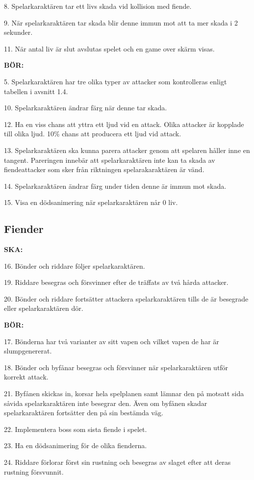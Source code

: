 \documentclass{TDP005mall}
\begin{document}
8. Spelarkaraktären tar ett livs skada vid kollision med fiende.

9. När spelarkaraktären tar skada blir denne immun mot att ta mer skada i 2 sekunder. 

11. När antal liv är slut avslutas spelet och en game over skärm visas.

\textbf{BÖR:}

5. Spelarkaraktären har tre olika typer av attacker som kontrolleras enligt tabellen i avsnitt 1.4.

10. Spelarkaraktären ändrar färg när denne tar skada.

12. Ha en viss chans att yttra ett ljud vid en attack. Olika attacker är kopplade till olika ljud. 10\% chans att producera ett ljud vid attack.

13. Spelarkaraktären ska kunna parera attacker genom att spelaren håller inne en tangent. Pareringen innebär att spelarkaraktären inte kan ta skada av fiendeattacker som sker från riktningen spelarakaraktären är vänd.

14. Spelarkaraktären ändrar färg under tiden denne är immun mot skada.

15. Visa en dödsanimering när spelarkaraktären når 0 liv.
\subsection{Fiender}
\textbf{SKA:}

16. Bönder och riddare följer spelarkaraktären.

19. Riddare besegras och försvinner efter de träffats av två hårda attacker.

20. Bönder och riddare fortsätter attackera spelarkaraktären tills de är besegrade eller spelarkaraktären dör.

\textbf{BÖR:}

17. Bönderna har två varianter av sitt vapen och vilket vapen de har är slumpgenererat.

18. Bönder och byfånar besegras och försvinner när spelarkaraktären utför korrekt attack.

21. Byfånen skickas in, korsar hela spelplanen samt lämnar den på motsatt sida såvida spelarkaraktären inte besegrar den. Även om byfånen skadar spelarkaraktären fortsätter den på sin bestämda väg.

22. Implementera boss som sista fiende i spelet.

23. Ha en dödsanimering för de olika fienderna.

24. Riddare förlorar först sin rustning och besegras av slaget efter att deras rustning försvunnit.
\end{document}
